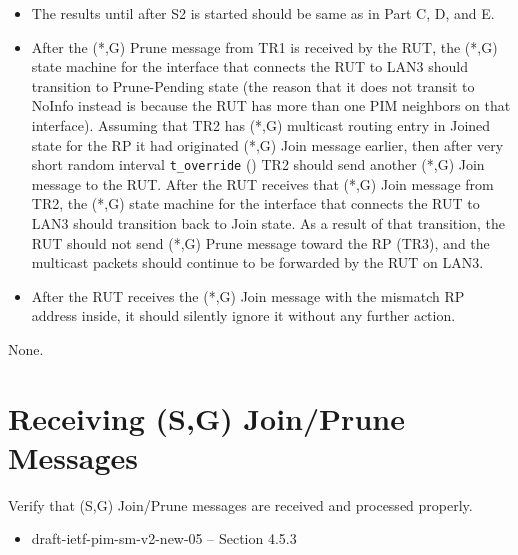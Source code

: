 \documentclass[11pt]{report}
\begin{document}

\begin{itemize}

  \item The results until after S2 is started should be same as in
  Part C, D, and E.

  \item After the (*,G) Prune message from TR1 is received by the RUT,
  the (*,G) state machine for the interface that connects the RUT to
  LAN3 should transition to Prune-Pending state (the reason that it does
  not transit to NoInfo instead is because the RUT has more than one PIM
  neighbors on that interface).
  Assuming that TR2 has (*,G) multicast routing entry in Joined state
  for the RP it had originated (*,G) Join message earlier, then after
  very short random interval \verb=t_override= ({\PimsmTOverride}) TR2
  should send another (*,G) Join message to the RUT.
  After the RUT receives that (*,G) Join message from TR2,
  the (*,G) state machine for the interface that connects the RUT to
  LAN3 should transition back to Join state.
  As a result of that transition, the RUT should not send (*,G) Prune
  message toward the RP (TR3), and the multicast packets should continue
  to be forwarded by the RUT on LAN3.

\end{itemize}


\begin{itemize}
  \item After the RUT receives the (*,G) Join message with the mismatch RP
  address inside, it should silently ignore it without any further action.
\end{itemize}

None.


\newpage
\section{Receiving (S,G) Join/Prune Messages}

Verify that (S,G) Join/Prune messages are received and processed
properly.

\begin{itemize}
  \item draft-ietf-pim-sm-v2-new-05 -- Section 4.5.3
\end{itemize}
\end{document}
